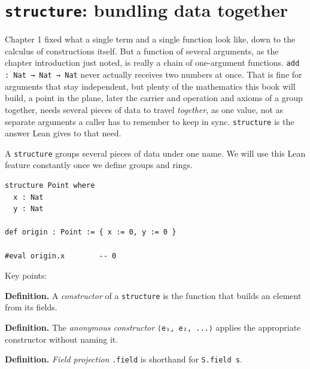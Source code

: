 \section{\texorpdfstring{\texttt{structure}: bundling data together}{structure: bundling data together}}\label{sec:03-functions-and-structures:01-structure-basics:1}

Chapter 1 fixed what a single term and a single function look like, down to the calculus of constructions itself. But a function of several arguments, as the chapter introduction just noted, is really a chain of one-argument functions. \texttt{add : Nat → Nat → Nat} never actually receives two numbers at once. That is fine for arguments that stay independent, but plenty of the mathematics this book will build, a point in the plane, later the carrier and operation and axioms of a group together, needs several pieces of data to travel \emph{together}, as one value, not as separate arguments a caller has to remember to keep in sync. \texttt{structure} is the answer Lean gives to that need.

A \texttt{structure} groups several pieces of data under one name. We will use this Lean feature constantly once we define groups and rings.

\begin{lstlisting}
structure Point where
  x : Nat
  y : Nat

def origin : Point := { x := 0, y := 0 }

#eval origin.x        -- 0
\end{lstlisting}

Key points:

\textbf{Definition.} A \emph{constructor} of a \texttt{structure} is the function that builds an element from its fields.

\textbf{Definition.} The \emph{anonymous constructor} \texttt{⟨e₁, e₂, ...⟩} applies the appropriate constructor without naming it.

\textbf{Definition.} \emph{Field projection} \texttt{.field} is shorthand for \texttt{S.field s}.

